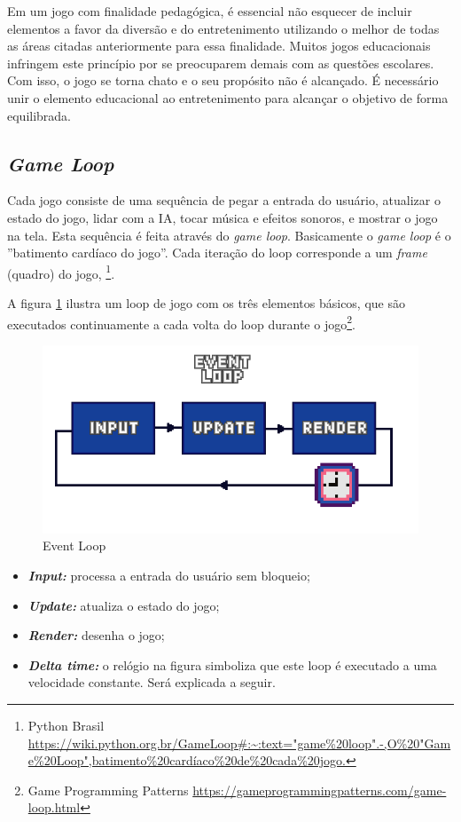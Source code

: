 Em um jogo com finalidade pedagógica, é essencial não esquecer de incluir elementos a favor da diversão e do entretenimento utilizando o melhor de todas as áreas citadas anteriormente para essa finalidade. Muitos jogos educacionais infringem este princípio por se preocuparem demais com as questões escolares. Com isso, o jogo se torna chato e o seu propósito não é alcançado. É necessário unir o elemento educacional ao entretenimento para alcançar o objetivo de forma equilibrada.

\subsection{\textit{Game Loop}}
\label{sec:game-loop}
Cada jogo consiste de uma sequência de pegar a entrada do usuário, atualizar o estado do jogo, lidar com a IA, tocar música e efeitos sonoros, e mostrar o jogo na tela. Esta sequência é feita através do \textit{game loop}. Basicamente o \textit{game loop} é o ''batimento cardíaco do jogo''. Cada iteração do loop corresponde a um \textit{frame} (quadro) do jogo, \footnote{Python Brasil \url{https://wiki.python.org.br/GameLoop#:~:text="game%20loop".-,O%20"Game%20Loop",batimento%20cardíaco%20de%20cada%20jogo.}}.

A figura \ref{fig:event-loop} ilustra um loop de jogo com os três elementos básicos, que são executados continuamente a cada volta do loop durante o jogo\footnote{Game Programming Patterns \url{https://gameprogrammingpatterns.com/game-loop.html}}.


\begin{figure}[h!]
    \centering
    \includegraphics[width=1\linewidth]{figuras/event-loop.png}
    \caption{Event Loop}
    \label{fig:event-loop}
\end{figure}

\begin{itemize}
    \item \textit{\textbf{Input:}} processa a entrada do usuário sem bloqueio;
    \item \textit{\textbf{Update:}} atualiza o estado do jogo;
    \item \textit{\textbf{Render:}}  desenha o jogo;
    \item \textit{\textbf{Delta time:}} o relógio na figura simboliza que este loop é executado a uma velocidade constante. Será explicada a seguir. 
\end{itemize}

